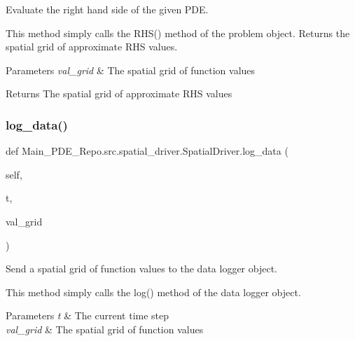 Evaluate the right hand side of the given P\+DE. 

This method simply calls the R\+H\+S() method of the problem object. Returns the spatial grid of approximate R\+HS values. 
\begin{DoxyParams}{Parameters}
{\em val\+\_\+grid} & The spatial grid of function values \\
\hline
\end{DoxyParams}
\begin{DoxyReturn}{Returns}
The spatial grid of approximate R\+HS values 
\end{DoxyReturn}
\mbox{\label{classMain__PDE__Repo_1_1src_1_1spatial__driver_1_1SpatialDriver_ace8ab1e2e0d8e9da601ecddf44d504c2}} 
\subsubsection{\texorpdfstring{log\+\_\+data()}{log\_data()}}
{\footnotesize\ttfamily def Main\+\_\+\+P\+D\+E\+\_\+\+Repo.\+src.\+spatial\+\_\+driver.\+Spatial\+Driver.\+log\+\_\+data (\begin{DoxyParamCaption}\item[{}]{self,  }\item[{}]{t,  }\item[{}]{val\+\_\+grid }\end{DoxyParamCaption})}



Send a spatial grid of function values to the data logger object. 

This method simply calls the log() method of the data logger object. 
\begin{DoxyParams}{Parameters}
{\em t} & The current time step \\
\hline
{\em val\+\_\+grid} & The spatial grid of function values \\
\hline
\end{DoxyParams}
\mbox{\label{classMain__PDE__Repo_1_1src_1_1spatial__driver_1_1SpatialDriver_a8383df7f86b0bca04a6787290438cde7}} 
